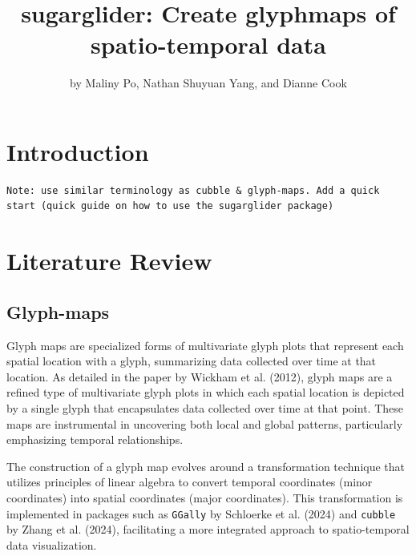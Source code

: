 \title{sugarglider: Create glyphmaps of spatio-temporal data}


\author{by Maliny Po, Nathan Shuyuan Yang, and Dianne Cook}

\maketitle


\hypertarget{introduction}{%
\section{Introduction}\label{introduction}}

\begin{verbatim}
Note: use similar terminology as cubble & glyph-maps. Add a quick start (quick guide on how to use the sugarglider package)
\end{verbatim}

\hypertarget{literature-review}{%
\section{Literature Review}\label{literature-review}}

\hypertarget{glyph-maps}{%
\subsection{Glyph-maps}\label{glyph-maps}}

Glyph maps are specialized forms of multivariate glyph plots that represent each spatial location with a glyph, summarizing data collected over time at that location. As detailed in the paper by Wickham et al. (2012), glyph maps are a refined type of multivariate glyph plots in which each spatial location is depicted by a single glyph that encapsulates data collected over time at that point. These maps are instrumental in uncovering both local and global patterns, particularly emphasizing temporal relationships.

The construction of a glyph map evolves around a transformation technique that utilizes principles of linear algebra to convert temporal coordinates (minor coordinates) into spatial coordinates (major coordinates). This transformation is implemented in packages such as \texttt{GGally} by Schloerke et al. (2024) and \texttt{cubble} by Zhang et al. (2024), facilitating a more integrated approach to spatio-temporal data visualization.


